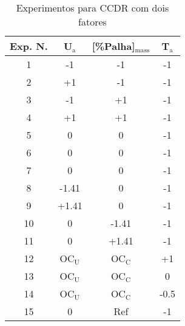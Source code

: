 \begin{table}
	\centering
	\caption{Experimentos para CCDR com dois fatores}
	\label{Cap3-Tab-2Fac}
	\begin{tabular}{cccc}
		\hline
		Exp. N. & U$_{\text{a}}$ & [\%Palha]$_{\text{mass}}$ &
		T$_{\text{a}}$ \\
		\hline
		1 & -1 & -1 & -1 \\
		2 & +1 & -1 & -1 \\
		3 & -1 & +1 & -1 \\
		4 & +1 & +1 & -1 \\
		5 & 0 & 0 & -1 \\
		6 & 0 & 0 & -1 \\
		7 & 0 & 0 & -1 \\
		8 & -1.41 & 0 & -1 \\
		9 & +1.41 & 0 & -1 \\
		10 & 0 & -1.41 & -1 \\
		11 & 0 & +1.41 & -1 \\
		12 & OC$_{\text{U}}$ & OC$_{\text{C}}$ & +1 \\
		13 & OC$_{\text{U}}$ & OC$_{\text{C}}$ & 0 \\
		14 & OC$_{\text{U}}$ & OC$_{\text{C}}$ & -0.5 \\
		15 & 0 & Ref & -1 \\
		\hline
	\end{tabular}
\end{table}
